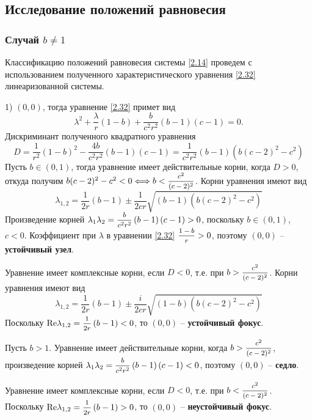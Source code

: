 \documentclass[a4paper,12pt, openany]{book}
\theoremstyle{plain} %
\theoremstyle{definition} %
\theoremstyle{remark} %
\numberwithin{equation}{chapter}
\begin{document}
{\subsection{Исследование положений равновесия}
\subsubsection*{Случай $b \neq 1$}


Классификацию положений равновесия системы \eqref{2.14} проведем с использованием полученного характеристического уравнения \eqref{2.32} линеаризованной системы. 

1) $(0,0)$, тогда уравнение \eqref{2.32} примет вид
$$
\lambda ^2  + \frac{\lambda }{r}\left( {1 - b} \right) + \frac{b}{{c^2 r^2 }}\left( {b - 1} \right)\left( {c - 1} \right) = 0.$$
Дискриминант полученного квадратного уравнения 
\[
D = \frac{1}{{r^2 }}\left( {1 - b} \right)^2  - \frac{{4b}}{{c^2 r^2 }}\left( {b - 1} \right)\left( {c - 1} \right) = \frac{1}{{c^2 r^2 }}\left( {b - 1} \right)\left( {b\left( {c - 2} \right)^2  - c^2 } \right)
\]
Пусть $b\in(0,1)$, тогда уравнение имеет действительные корни, когда $D>0$, откуда получим $b(c-2)^2 - c^2 < 0 \Longleftrightarrow b< \mfrac{c^2}{(c-2)^2}$. Корни уравнения имеют вид
\[
\lambda _{1,2}  = \frac{1}{{2r}}\left( {b - 1} \right) \pm \frac{1}{{2cr}}\sqrt {\left( {b - 1} \right)\left( {b\left( {c - 2} \right)^2  - c^2 } \right)} 
\]
Произведение корней $\lambda_1 \lambda_2 = \mfrac{b}{{c^2 r^2 }}\left( {b - 1} \right)\left( {c - 1} \right) > 0
$, поскольку $b\in(0,1)$, $c<0$. Коэффициент при $\lambda$ в уравнении \eqref{2.32} $\mfrac{1-b}{r} >0$, поэтому $(0,0)$ -- \textbf{устойчивый узел}.

Уравнение имеет комплексные корни, если $D<0$, т.е. при $b> \mfrac{c^2}{(c-2)^2}$. Корни уравнения имеют вид
\[
\lambda _{1,2}  = \frac{1}{{2r}}\left( {b - 1} \right) \pm \frac{i}{{2cr}}\sqrt {\left( {1 - b} \right)\left( {b\left( {c - 2} \right)^2  - c^2 } \right)} 
\]
Поскольку $
{\mathop{\rm Re}\nolimits} \lambda _{1,2}  = \mfrac{1}{{2r}}\left( {b - 1} \right) < 0
$, то $(0,0)$ -- \textbf{устойчивый фокус}. 

Пусть $b>1$. Уравнение имеет действительные корни, когда $b> \mfrac{c^2}{(c-2)^2}$, произведение корней $
\lambda _1 \lambda _2  = \mfrac{b}{{c^2 r^2 }}\left( {b - 1} \right)\left( {c - 1} \right) < 0$, поэтому $(0,0)$ -- \textbf{седло}.

Уравнение имеет комплексные корни, если $D<0$, т.е. при $b< \mfrac{c^2}{(c-2)^2}$. Поскольку $
{\mathop{\rm Re}\nolimits} \lambda _{1,2}  = \mfrac{1}{{2r}}\left( {b - 1} \right) > 0$, то $(0,0)$ -- \textbf{неустойчивый фокус}. 

}
\end{document}
